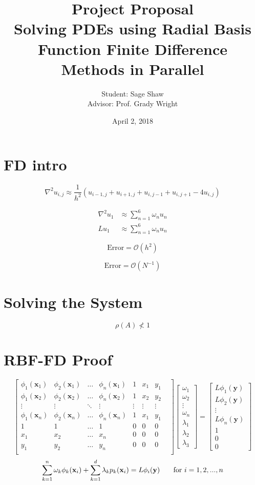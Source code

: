 \documentclass[12pt]{article}
\title{Project Proposal\\ \large Solving PDEs using Radial Basis Function Finite Difference Methods in Parallel}
\author{Student: Sage Shaw\\ Advisor: Prof. Grady Wright}
\date{April 2, 2018}
\let\vec\mathbf
\begin{document}
	\thispagestyle{empty}
	
	
\section{FD intro}

$$
\nabla^2u_{i,j} \approx \frac{1}{h^2}\left( u_{i-1,j} + u_{i+1, j} + u_{i, j-1} +u_{i, j+1} - 4u_{i,j} \right)
$$

\begin{align*}
	\nabla^2u_{1} & \approx \sum_{n=1}^6 \omega_n u_n \\
	Lu_{1} & \approx \sum_{n=1}^6 \omega_n u_n
\end{align*}

$$
\text{Error} = \mathcal{O}(h^2)
$$

$$
\text{Error} = \mathcal{O}(N^{-1})
$$

	
\section{Solving the System}

$$
\rho(A) \nless 1
$$	

\section{RBF-FD Proof}
$$
\begin{bmatrix}
	\phi_1(\vec{x}_1) & \phi_2(\vec{x}_1) & \dots & \phi_n(\vec{x}_1) & 1 & x_1 & y_1 \\
	\phi_1(\vec{x}_2) & \phi_2(\vec{x}_2) & \dots & \phi_n(\vec{x}_2) & 1 & x_2 & y_2 \\
	\vdots 		& \vdots	& \ddots& \vdots & \vdots& \vdots& \vdots& \\
	\phi_1(\vec{x}_n) & \phi_2(\vec{x}_n) & \dots & \phi_n(\vec{x}_n) & 1 & x_1 & y_1 \\
	1 & 1 & \dots & 1 & 0 & 0 & 0\\
	x_1 & x_2 & \dots & x_n & 0 & 0 & 0\\
	y_1 & y_2 & \dots & y_n & 0 & 0 & 0\\
\end{bmatrix}
\begin{bmatrix}
	\omega_1 \\ \omega_2 \\ \vdots \\ \omega_n \\
	\lambda_1 \\ \lambda_2 \\ \lambda_3
\end{bmatrix}
=
\begin{bmatrix}
	L\phi_1(\vec{y}) \\ L\phi_2(\vec{y}) \\ \vdots \\ L\phi_n(\vec{y}) \\
	1 \\ 0 \\ 0 
\end{bmatrix}
$$
$$
\sum\limits_{k=1}^n \omega_k\phi_k(\vec{x}_i) + \sum\limits_{k=1}^d \lambda_k p_k(\vec{x}_i) = L\phi_i(\vec{y}) \text{\phantom{==} for } i=1,2,...,n
$$
\end{document}
